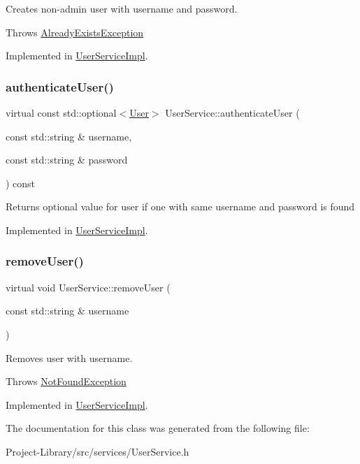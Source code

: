 Creates non-\/admin user with username and password.

Throws \hyperlink{classAlreadyExistsException}{Already\+Exists\+Exception} 

Implemented in \hyperlink{classUserServiceImpl_adf6e4832c7da54d3894f3eb554a8ffe1}{User\+Service\+Impl}.

\mbox{\label{classUserService_ae98e5e71adb53af6fdafb270a766f512}} 
\subsubsection{\texorpdfstring{authenticate\+User()}{authenticateUser()}}
{\footnotesize\ttfamily virtual const std\+::optional$<$\hyperlink{classUser}{User}$>$ User\+Service\+::authenticate\+User (\begin{DoxyParamCaption}\item[{const std\+::string \&}]{username,  }\item[{const std\+::string \&}]{password }\end{DoxyParamCaption}) const\hspace{0.3cm}{\ttfamily [pure virtual]}}

Returns optional value for user if one with same username and password is found 

Implemented in \hyperlink{classUserServiceImpl_a6ea0a8f645f2be10ca7d48ca232fe70a}{User\+Service\+Impl}.

\mbox{\label{classUserService_aab158c8d9ed5c8cf7d62b762d62ea9b4}} 
\subsubsection{\texorpdfstring{remove\+User()}{removeUser()}}
{\footnotesize\ttfamily virtual void User\+Service\+::remove\+User (\begin{DoxyParamCaption}\item[{const std\+::string \&}]{username }\end{DoxyParamCaption})\hspace{0.3cm}{\ttfamily [pure virtual]}}

Removes user with username.

Throws \hyperlink{classNotFoundException}{Not\+Found\+Exception} 

Implemented in \hyperlink{classUserServiceImpl_a3549c348a3c24d4b0519339c0123460d}{User\+Service\+Impl}.



The documentation for this class was generated from the following file\+:\begin{DoxyCompactItemize}
\item 
Project-\/\+Library/src/services/User\+Service.\+h\end{DoxyCompactItemize}
